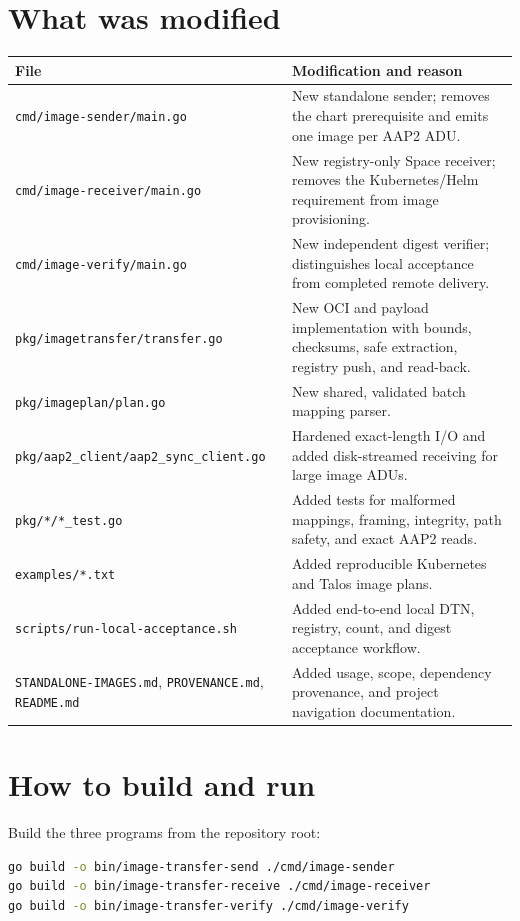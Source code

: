 \documentclass[11pt,a4paper]{article}
\newcommand{\file}[1]{\texttt{#1}}
\begin{document}
\section{What was modified}
\begin{longtable}{p{}p{}}
\toprule
File & Modification and reason\\ \midrule
\file{cmd/image-sender/main.go} & New standalone sender; removes the chart
prerequisite and emits one image per AAP2 ADU.\\
\file{cmd/image-receiver/main.go} & New registry-only Space receiver; removes
the Kubernetes/Helm requirement from image provisioning.\\
\file{cmd/image-verify/main.go} & New independent digest verifier; distinguishes
local acceptance from completed remote delivery.\\
\file{pkg/imagetransfer/transfer.go} & New OCI and payload implementation with
bounds, checksums, safe extraction, registry push, and read-back.\\
\file{pkg/imageplan/plan.go} & New shared, validated batch mapping parser.\\
\file{pkg/aap2_client/aap2_sync_client.go} & Hardened exact-length I/O and added
disk-streamed receiving for large image ADUs.\\
\file{pkg/*/*_test.go} & Added tests for malformed mappings, framing,
integrity, path safety, and exact AAP2 reads.\\
\file{examples/*.txt} & Added reproducible Kubernetes and Talos image plans.\\
\file{scripts/run-local-acceptance.sh} & Added end-to-end local DTN, registry,
count, and digest acceptance workflow.\\
\file{STANDALONE-IMAGES.md}, \file{PROVENANCE.md}, \file{README.md} & Added usage,
scope, dependency provenance, and project navigation documentation.\\
\bottomrule
\end{longtable}

\section{How to build and run}
Build the three programs from the repository root:
\begin{lstlisting}[language=bash,numbers=none]
go build -o bin/image-transfer-send ./cmd/image-sender
go build -o bin/image-transfer-receive ./cmd/image-receiver
go build -o bin/image-transfer-verify ./cmd/image-verify
\end{lstlisting}
\end{document}
